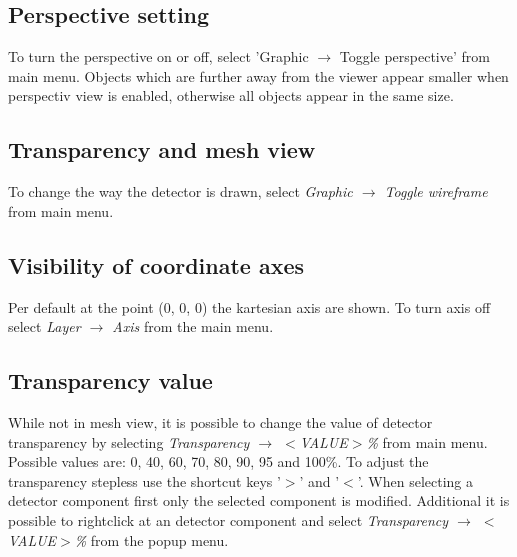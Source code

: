 \documentclass[a4paper,10pt]{article}
\begin{document}
\subsection{Perspective setting}
To turn the perspective on or off, select 'Graphic $\rightarrow$ Toggle perspective' from main menu. 
Objects which are further away from the viewer appear smaller when perspectiv view is enabled, otherwise all objects appear in the same size.

\subsection{Transparency and mesh view}
To change the way the detector is drawn, select \textit{Graphic $\rightarrow$ Toggle wireframe} from main menu.
\subsection{Visibility of coordinate axes}
Per default at the point (0, 0, 0) the kartesian axis are shown.
To turn axis off select \textit{Layer $\rightarrow$ Axis} from the main menu.


\subsection{Transparency value}
While not in mesh view, it is possible to change the value of detector transparency by selecting \textit{Transparency $\rightarrow$ $<$VALUE$>$\%} from main menu. 
Possible values are: 0, 40, 60, 70, 80, 90, 95 and 100\%.
To adjust the transparency stepless use the shortcut keys '$>$' and '$<$'. 
When selecting a detector component first only the selected component is modified. 
Additional it is possible to rightclick at an detector component and select \textit{Transparency $\to$ $<$VALUE$>$\%} from the popup menu.
\end{document}
